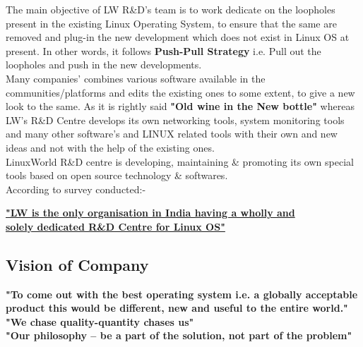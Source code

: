 \documentclass[12pt,oneside,a4paper]{report}
\begin{document}
\begin{enumerate}
The main objective of LW R\&D's team is to work dedicate on the loopholes present in the existing Linux Operating System, to ensure that the same are removed and plug-in the new development which does not exist in Linux OS at present. In other words, it follows \textbf{Push-Pull Strategy} i.e. Pull out the loopholes and push in the new developments.\\
Many companies' combines various software available in the communities/platforms and edits the existing ones to some extent, to give a new look to the same. As it is rightly said \textbf{"Old wine in the New bottle"} whereas LW's R\&D Centre develops its own networking tools, system monitoring tools and many other software's and LINUX related tools with their own and new ideas and not with the help of the existing ones.\\\vspace{5.0mm}
LinuxWorld R\&D centre is developing, maintaining \& promoting its own special tools based on open source technology \& softwares. 
\vspace{5.0mm}\\
According to survey conducted:-
\fontsize{18pt}{10pt}\selectfont
\begin{center}
\textbf{\underline{"LW is the only organisation in India having a wholly and} \vspace{2.0mm}\\\underline{solely dedicated R\&D Centre for Linux OS"}}
\end{center}
\end{enumerate}

\subsection{Vision of Company}\vspace{10.0mm}
\fontsize{18pt}{10pt}\selectfont
\begin{center}
\textbf{"To come out with the best operating system i.e. a globally acceptable product this would be different, new and useful to the entire world."}\vspace{15.0mm}\\
\textbf{"We chase quality-quantity chases us"}\vspace{15.0mm}\\
\textbf{"Our philosophy – be a part of the solution, not part of the problem"}
\end{center}


\end{document}
